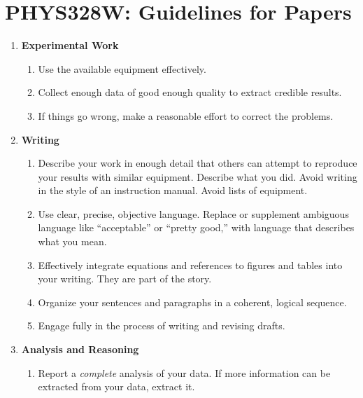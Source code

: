 \documentclass[11 pt]{article}
\begin{document}
\section*{PHYS328W: Guidelines for Papers}

\begin{enumerate}
\item \textbf{Experimental Work}
  \begin{enumerate}
  \item Use the available equipment effectively.

  \item Collect enough data of good enough quality to extract credible
    results.

  \item If things go wrong, make a reasonable effort to correct
    the problems.

  \end{enumerate}

\item \textbf{Writing}
  \begin{enumerate}
  \item Describe your work in enough detail that others can attempt to
    reproduce your results with similar equipment. Describe what you
    did. Avoid writing in the style of an instruction
    manual. Avoid lists of equipment.  

  \item Use clear, precise, objective language. Replace or supplement
    ambiguous language like ``acceptable'' or ``pretty good,'' with
    language that describes what you mean.

  \item Effectively integrate equations and references to figures and
    tables into your writing. They are part of the story. 

  \item Organize your sentences and paragraphs in a coherent, logical
    sequence. 

  \item Engage fully in the process of writing and revising drafts.

  \end{enumerate}

\item \textbf{Analysis and Reasoning}
  \begin{enumerate}
  \item Report a \textit{complete} analysis of your data. If more
    information can be extracted from your data, extract it.


\end{enumerate}
\end{enumerate}
\end{document}
